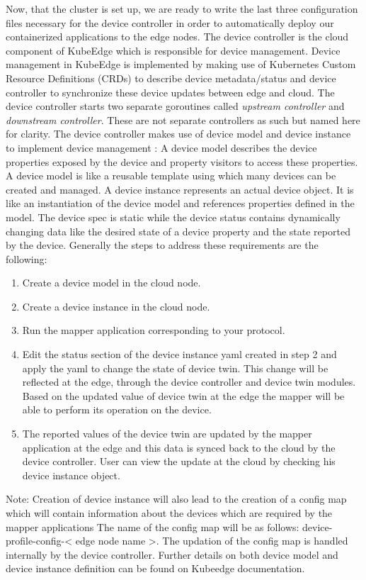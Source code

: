 Now, that the cluster is set up, we are ready to write the last three configuration files necessary for the device controller in order to automatically deploy our containerized applications to the edge nodes.
The device controller is the cloud component of KubeEdge which is responsible for device management. Device management in KubeEdge is implemented by making use of Kubernetes Custom Resource Definitions (CRDs) to describe device metadata/status and device controller to synchronize these device updates between edge and cloud. The device controller starts two separate goroutines called \textit{upstream controller} and \textit{downstream controller}. These are not separate controllers as such but named here for clarity.
The device controller makes use of device model and device instance to implement device management :
A device model describes the device properties exposed by the device and property visitors to access these properties. A device model is like a reusable template using which many devices can be created and managed. A device instance represents an actual device object. It is like an instantiation of the device model and references properties defined in the model. The device spec is static while the device status contains dynamically changing data like the desired state of a device property and the state reported by the device.
Generally the steps to address these requirements are the following:
\begin{enumerate}
	\item Create a device model in the cloud node.
	\item Create a device instance in the cloud node.
	\item Run the mapper application corresponding to your protocol.
	\item Edit the status section of the device instance yaml created in step 2 and apply the yaml to change the state of device twin. This change will be reflected at the edge, through the device controller and device twin modules. Based on the updated value of device twin at the edge the mapper will be able to perform its operation on the device.
	\item The reported values of the device twin are updated by the mapper application at the edge and this data is synced back to the cloud by the device controller. User can view the update at the cloud by checking his device instance object.
\end{enumerate}

Note: Creation of device instance will also lead to the creation of a config map which will contain information about the devices which are required by the mapper applications The name of the config map will be as follows: device-profile-config-< edge node name >. The updation of the config map is handled internally by the device controller.
Further details on both device model and device instance definition can be found on Kubeedge documentation.

